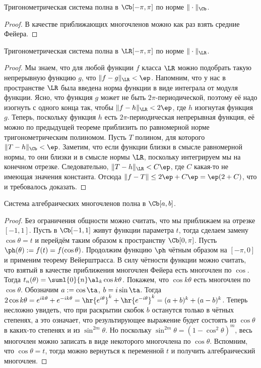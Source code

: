 \documentclass[a4paper]{article}
\begin{document}
\begin{theorem}[Вейерштрасса]
Тригонометрическая система полна в $\Cb[-\pi,\pi]$ по норме $\|\cdot\|_{\Cb}$.
\end{theorem}
\begin{proof}
В качестве приближающих многочленов можно как раз взять средние Фейера.
\end{proof}

\begin{imp}
Тригонометрическая система полна в $\LR[-\pi,\pi]$ по норме $\|\cdot\|_{\LR}$.
\end{imp}
\begin{proof}
Мы знаем, что для любой функции $f$ класса $\LR$ можно подобрать такую непрерывную функцию $g$, что $\|f - g\|_{\LR} < \ep$.
Напомним, что у нас в пространстве $\LR$ была введена норма функции в виде интеграла от модуля функции. Ясно, что функция $g$
может не быть $2\pi$-периодической, поэтому её надо изогнуть с одного конца так, чтобы $\|f - h\|_{\LR} < 2\ep$, где $h$
изогнутая функция $g$. Теперь, поскольку функция $h$ есть $2\pi$-периодическая непрерывная функция, её можно по предыдущей
теореме приблизить по равномерной норме тригонометрическим полиномом. Пусть $T$ полином, для которого $\|T - h\|_{\Cb} < \ep$.
Заметим, что если функции близки в смысле равномерной нормы, то они близки и в смысле нормы $\LR$, поскольку интегрируем
мы на конечном отрезке. Следовательно, $\|T-h\|_{\LR} < C\ep$, где $C$ какая-то не имеющая значения константа.
Отсюда $\|f - T\| \le 2\ep + C\ep = \ep(2 + C)$, что и требовалось доказать.
\end{proof}

\begin{theorem}[Вейерштрасса II]
Система алгебраических многочленов полна в $\Cb[a,b]$.
\end{theorem}
\begin{proof}
Без ограничения общности можно считать, что мы приближаем на отрезке $[-1,1]$. Пусть в $\Cb[-1,1]$ живут функции параметра $t$,
тогда сделаем замену $\cos \theta = t$ и перейдём таким образом к пространству $\Cb[0,\pi]$. Пусть $\ph(\theta) := f(t) = f(\cos \theta)$. Продолжим
функцию $\ph$ чётным образом на $[-\pi,0]$ и применим теорему Вейерштрасса. В силу чётности функции можно считать, что взятый в качестве
приближения многочлен Фейера есть многочлен по $\cos$. Тогда $t_n(\theta) = \suml{0}{n}\al_k\cos k\theta$. Покажем, что
$\cos k\theta$ есть многочлен по $\cos\theta$. Обозначим $a := \cos\ta$, $b=i\sin\ta$. Тогда
$2\cos k\theta = e^{ik\theta} + e^{-ik\theta}=\hr{e^{i\theta}}^k + \hr{e^{-i\theta}}^k=
(a+b)^k + (a-b)^k$.
Теперь несложно увидеть, что при раскрытии скобок $b$ останутся только в чётных степенях, а это означает, что
результирующее выражение будет состоять из $\cos\theta$ в каких-то степенях и из $\sin^{2m}\theta$. Но поскольку $\sin^{2m}\theta = (1-\cos^2\theta)^m$,
весь многочлен можно записать в виде некоторого многочлена по $\cos \theta$. Вспомним, что $\cos\theta = t$, тогда можно вернуться к переменной $t$ и
получить алгебраический многочлен.
\end{proof}
\end{document}

